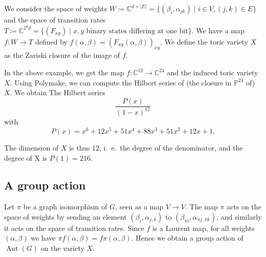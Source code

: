 We consider the space of weights $W \coloneqq \mathbb C^{d+|E|} = \{(\beta_{i},\alpha_{jk})\mid i\in V,(j,k)\in E\}$ and the space of transition rates $T \coloneqq \mathbb C^{2^{d}d} = \{(F_{xy}) \mid x,y \text{ binary states differing at one bit}\}$. We have a map
$f\colon W\to T$ defined by $f(\alpha,\beta) = (F_{xy}(\alpha,\beta))_{xy}$. We define the toric variety $X$ as the Zariski closure of the image of $f$.

In the above example, we get the map $f\colon \mathbb C^{12}\to \mathbb C^{24}$ and the induced toric variety $X$. Using Polymake, we can compute the Hilbert series of (the closure in $\mathbb P^{24}$ of) $X$. We obtain The Hilbert series
	\[\frac{P(x)}{(1-x)^{12}}\]
with \[P(x)=x^6 + 12x^5 + 51x^4 + 88x^3 + 51x^2 + 12x + 1.\]

The dimension of $X$ is thus $12$, i.\ e.\ the degree of the denominator, and the degree of X is $P(1)=216$.

\subsection*{A group action}
Let $\pi$ be a graph isomorphism of $G$, seen as a map $V\to V$. The map $\pi$ acts on the space of weights by sending an element $(\beta_i,\alpha_{j,k})$ to $(\beta_{\pi i},\alpha_{\pi{j},\pi{k}})$, and similarly it acts on the space of transition rates. Since $f$ is a Laurent map, for all weights $(\alpha,\beta)$ we have $\pi f (\alpha,\beta) = f \pi (\alpha, \beta)$. Hence we obtain a group action of $\operatorname{Aut}(G)$ on the variety $X$.